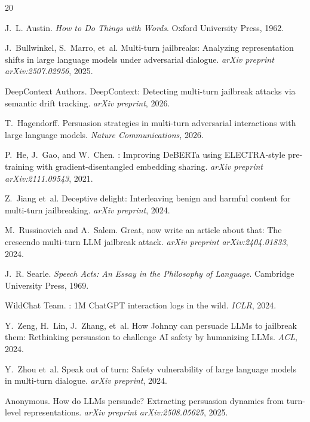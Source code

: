 \documentclass[11pt,a4paper]{article}
\begin{document}

\begin{thebibliography}{20}

J.~L. Austin.
\newblock \emph{How to Do Things with Words}.
\newblock Oxford University Press, 1962.

J.~Bullwinkel, S.~Marro, et~al.
\newblock Multi-turn jailbreaks: Analyzing representation shifts in large language models under adversarial dialogue.
\newblock \emph{arXiv preprint arXiv:2507.02956}, 2025.

DeepContext Authors.
\newblock DeepContext: Detecting multi-turn jailbreak attacks via semantic drift tracking.
\newblock \emph{arXiv preprint}, 2026.

T.~Hagendorff.
\newblock Persuasion strategies in multi-turn adversarial interactions with large language models.
\newblock \emph{Nature Communications}, 2026.

P.~He, J.~Gao, and W.~Chen.
: Improving {DeBERTa} using {ELECTRA}-style pre-training with gradient-disentangled embedding sharing.
\newblock \emph{arXiv preprint arXiv:2111.09543}, 2021.

Z.~Jiang et~al.
\newblock Deceptive delight: Interleaving benign and harmful content for multi-turn jailbreaking.
\newblock \emph{arXiv preprint}, 2024.

M.~Russinovich and A.~Salem.
\newblock Great, now write an article about that: The crescendo multi-turn {LLM} jailbreak attack.
\newblock \emph{arXiv preprint arXiv:2404.01833}, 2024.

J.~R. Searle.
\newblock \emph{Speech Acts: An Essay in the Philosophy of Language}.
\newblock Cambridge University Press, 1969.

WildChat Team.
: 1{M} {ChatGPT} interaction logs in the wild.
\newblock \emph{ICLR}, 2024.

Y.~Zeng, H.~Lin, J.~Zhang, et~al.
\newblock How {Johnny} can persuade {LLMs} to jailbreak them: Rethinking persuasion to challenge {AI} safety by humanizing {LLMs}.
\newblock \emph{ACL}, 2024.

Y.~Zhou et~al.
\newblock Speak out of turn: Safety vulnerability of large language models in multi-turn dialogue.
\newblock \emph{arXiv preprint}, 2024.

Anonymous.
\newblock How do {LLMs} persuade? {E}xtracting persuasion dynamics from turn-level representations.
\newblock \emph{arXiv preprint arXiv:2508.05625}, 2025.

\end{thebibliography}
\end{document}
